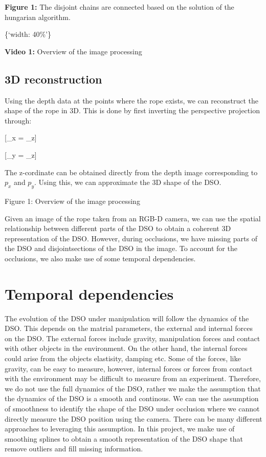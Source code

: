\textbf{Figure 1:} The disjoint chains are connected based on the
solution of the hungarian algorithm.

\{`width:
40\%'\}

\textbf{Video 1:} Overview of the image processing

\subsection{3D reconstruction}\label{d-reconstruction}

Using the depth data at the points where the rope exists, we can
reconstruct the shape of the rope in 3D. This is done by first inverting
the perspective projection through:

{[}\_x =  \_z{]}

{[}\_y =  \_z{]}

The z-cordinate can be obtained directly from the depth image
corresponding to \(p_x\) and \(p_y\). Using this, we can approximate the
3D shape of the DSO.

Figure 1: Overview of the image processing

Given an image of the rope taken from an RGB-D camera, we can use the
spatial relationship between different parts of the DSO to obtain a
coherent 3D representation of the DSO. However, during occlusions, we
have missing parts of the DSO and disjointsections of the DSO in the
image. To account for the occlusions, we also make use of some temporal
dependencies.

\section{Temporal dependencies}\label{temporal-dependencies}

The evolution of the DSO under manipulation will follow the dynamics of
the DSO. This depends on the matrial parameters, the external and
internal forces on the DSO. The external forces include gravity,
manipulation forces and contact with other objects in the environment.
On the other hand, the internal forces could arise from the objects
elastisity, damping etc. Some of the forces, like gravity, can be easy
to measure, however, internal forces or forces from contact with the
environment may be difficult to measure from an experiment. Therefore,
we do not use the full dynamics of the DSO, rather we make the
assumption that the dynamics of the DSO is a smooth and continous. We
can use the assumption of smoothness to identify the shape of the DSO
under occlusion where we cannot directly measure the DSO position using
the camera. There can be many different approaches to leveraging this
assumption. In this project, we make use of smoothing splines to obtain
a smooth representation of the DSO shape that remove outliers and fill
missing information.

